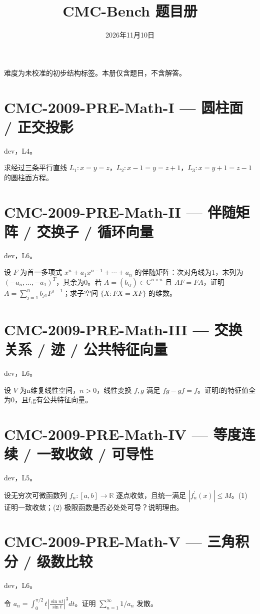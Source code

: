 \documentclass[UTF8]{ctexart}
\title{CMC-Bench 题目册}
\date{2026年11月10日}
\begin{document}
\maketitle

难度为未校准的初步结构标签。本册仅含题目，不含解答。

\section*{CMC-2009-PRE-Math-I — 圆柱面 / 正交投影}

dev，L4。

求经过三条平行直线 $L_1:x=y=z$，$L_2:x-1=y=z+1$，$L_3:x=y+1=z-1$ 的圆柱面方程。

\section*{CMC-2009-PRE-Math-II — 伴随矩阵 / 交换子 / 循环向量}

dev，L6。

设 $F$ 为首一多项式 $x^n+a_1x^{n-1}+\cdots+a_n$ 的伴随矩阵：次对角线为1，末列为 $(-a_n,\ldots,-a_1)^T$，其余为0。若 $A=(b_{ij})\in\mathbb C^{n\times n}$ 且 $AF=FA$，证明 $A=\sum_{j=1}^n b_{j1}F^{j-1}$；求子空间 $\{X:FX=XF\}$ 的维数。

\section*{CMC-2009-PRE-Math-III — 交换关系 / 迹 / 公共特征向量}

dev，L6。

设 $V$ 为n维复线性空间，$n>0$，线性变换 $f,g$ 满足 $fg-gf=f$。证明f的特征值全为0，且f,g有公共特征向量。

\section*{CMC-2009-PRE-Math-IV — 等度连续 / 一致收敛 / 可导性}

dev，L5。

设无穷次可微函数列 $f_n:[a,b]\to\mathbb R$ 逐点收敛，且统一满足 $|f_n^{\prime}(x)|\le M$。(1) 证明一致收敛；(2) 极限函数是否必处处可导？说明理由。

\section*{CMC-2009-PRE-Math-V — 三角积分 / 级数比较}

dev，L6。

令 $a_n=\int_0^{\pi/2}t\left|\frac{\sin nt}{\sin t}\right|^3dt$。证明 $\sum_{n=1}^\infty1/a_n$ 发散。
\end{document}
